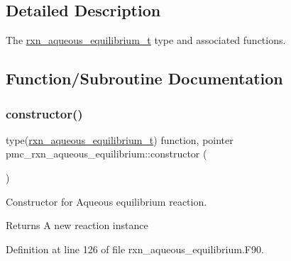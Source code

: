 \subsection{Detailed Description}
The \mbox{\hyperlink{structpmc__rxn__aqueous__equilibrium_1_1rxn__aqueous__equilibrium__t}{rxn\+\_\+aqueous\+\_\+equilibrium\+\_\+t}} type and associated functions. 

\subsection{Function/\+Subroutine Documentation}
\mbox{\label{namespacepmc__rxn__aqueous__equilibrium_ae6c5b3259b8d34ae01cf59fb68e950a2}} 
\subsubsection{\texorpdfstring{constructor()}{constructor()}}
{\footnotesize\ttfamily type(\mbox{\hyperlink{structpmc__rxn__aqueous__equilibrium_1_1rxn__aqueous__equilibrium__t}{rxn\+\_\+aqueous\+\_\+equilibrium\+\_\+t}}) function, pointer pmc\+\_\+rxn\+\_\+aqueous\+\_\+equilibrium\+::constructor (\begin{DoxyParamCaption}{ }\end{DoxyParamCaption})\hspace{0.3cm}{\ttfamily [private]}}



Constructor for Aqueous equilibrium reaction. 

\begin{DoxyReturn}{Returns}
A new reaction instance 
\end{DoxyReturn}


Definition at line 126 of file rxn\+\_\+aqueous\+\_\+equilibrium.\+F90.

\mbox{\label{namespacepmc__rxn__aqueous__equilibrium_a1563a3411636e56a81e0915d45085e45}} 
